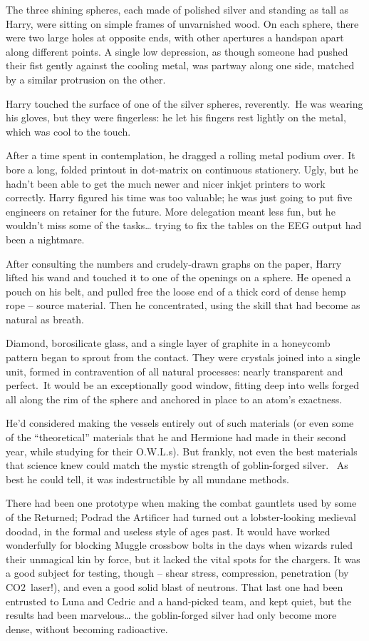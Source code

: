 \mybreak

The three shining spheres, each made of polished silver and standing as
tall as Harry, were sitting on simple frames of unvarnished wood. On
each sphere, there were two large holes at opposite ends, with other
apertures a handspan apart along different points. A single low
depression, as though someone had pushed their fist gently against the
cooling metal, was partway along one side, matched by a similar
protrusion on the other.

Harry touched the surface of one of the silver spheres, reverently.~He
was wearing his gloves, but they were fingerless: he let his fingers
rest lightly on the metal, which was cool to the touch.

After a time spent in contemplation, he dragged a rolling metal podium
over. It bore a long, folded printout in dot-matrix on continuous
stationery. Ugly, but he hadn't been able to get the much newer and
nicer inkjet printers to work correctly. Harry figured his time was too
valuable; he was just going to put five engineers on retainer for the
future. More delegation meant less fun, but he wouldn't miss some of the
tasks\ldots{} trying to fix the tables on the EEG output had been a
nightmare.

After consulting the numbers and crudely-drawn graphs on the paper,
Harry lifted his wand and touched it to one of the openings on a sphere.
He opened a pouch on his belt, and pulled free the loose end of a thick
cord of dense hemp rope -- source material. Then he concentrated, using
the skill that had become as natural as breath.

Diamond, borosilicate glass, and a single layer of graphite in a
honeycomb pattern began to sprout from the contact. They were crystals
joined into a single unit, formed in contravention of all natural
processes: nearly transparent and perfect.~It would be an exceptionally
good window, fitting deep into wells forged all along the rim of the
sphere and anchored in place to an atom's exactness.

He'd considered making the vessels entirely out of such materials (or
even some of the ``theoretical'' materials that he and Hermione had made
in their second year, while studying for their O.W.L.s). But frankly,
not even the best materials that science knew could match the mystic
strength of goblin-forged silver. ~As best he could tell, it was
indestructible by all mundane methods.

There had been one prototype when making the combat gauntlets used by
some of the Returned; Podrad the Artificer had turned out a
lobster-looking medieval doodad, in the formal and useless style of ages
past. It would have worked wonderfully for blocking Muggle crossbow
bolts in the days when wizards ruled their unmagical kin by force, but
it lacked the vital spots for the chargers. It was a good subject for
testing, though -- shear stress, compression, penetration (by
CO2~laser!), and even a good solid blast of neutrons. That last one had
been entrusted to Luna and Cedric and a hand-picked team, and kept
quiet, but the results had been marvelous\ldots{} the goblin-forged
silver had only become more dense, without becoming radioactive.

